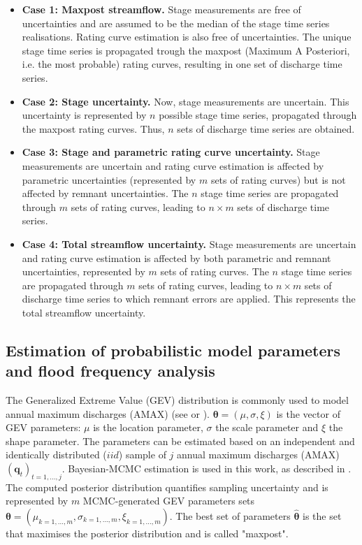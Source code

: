 \documentclass[11pt]{article}
\begin{document}
   \begin{itemize}
       \item \textbf{Case 1: Maxpost streamflow.} Stage measurements are free of uncertainties and are assumed to be the median of the stage time series realisations. Rating curve estimation is also free of uncertainties. The unique stage time series is propagated trough the maxpost (Maximum A Posteriori, i.e. the most probable) rating curves, resulting in one set of discharge time series. 
       \item \textbf{Case 2: Stage uncertainty.} Now, stage measurements are uncertain. This uncertainty is represented by $n$ possible stage time series, propagated through the maxpost rating curves. Thus, $n$ sets of discharge time series are obtained.
       \item \textbf{Case 3: Stage and parametric rating curve uncertainty.} Stage measurements are uncertain and rating curve estimation is affected by parametric uncertainties (represented by $m$ sets of rating curves) but is not affected by remnant uncertainties. The $n$ stage time series are propagated through $m$ sets of rating curves, leading to $n \times m$ sets of discharge time series. 
       \item \textbf{Case 4: Total streamflow uncertainty.} Stage measurements are uncertain and rating curve estimation is affected by both parametric and remnant uncertainties, represented by $m$ sets of rating curves. The $n$ stage time series are propagated through $m$ sets of rating curves, leading to $n \times m$ sets of discharge time series to which remnant errors are applied. This represents the total streamflow uncertainty.
   \end{itemize}
   
    \subsection{Estimation of probabilistic model parameters and flood frequency analysis}
    \label{sec:STOODS}
    
    The Generalized Extreme Value (GEV) distribution is commonly used to model annual maximum discharges (AMAX) (see \citet{hamed_flood_2019} or \citet{jain_design_2019}). $\boldsymbol{\theta} = (\mu,\sigma,\xi)$ is the vector of GEV parameters: $\mu$ is the location parameter, $\sigma$ the scale parameter and $\xi$ the shape parameter. The parameters can be estimated based on an independent and identically distributed ($iid$) sample of $j$ annual maximum discharges (AMAX) $(\mathbf{q}_t)_{t=1,...,j}$. Bayesian-MCMC estimation is used in this work, as described in \citet{renard_application_2006}. The computed posterior distribution quantifies sampling uncertainty and is represented by $m$ MCMC-generated GEV parameters sets $\boldsymbol{\theta} = (\mu_{k=1,...,m},\sigma_{k=1,...,m},\xi_{k=1,...,m})$. The best set of parameters $\boldsymbol{\hat{\theta}}$ is the set that maximises the posterior distribution and is called "maxpost". 
    
\end{document}
